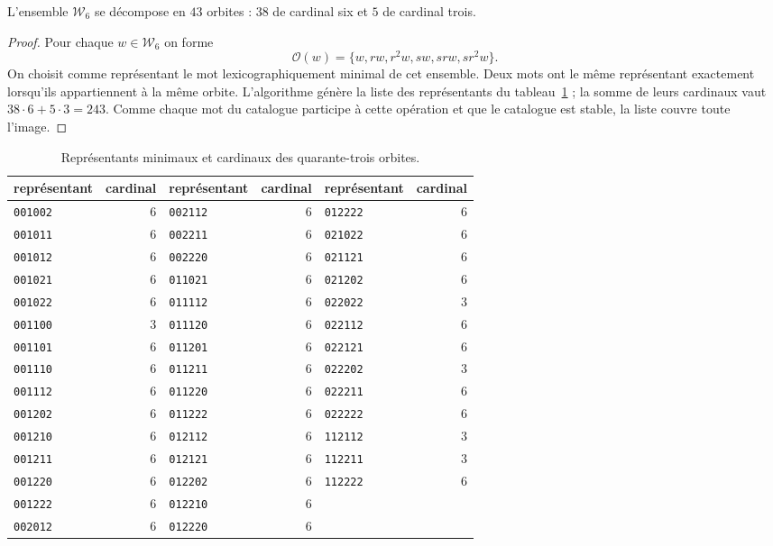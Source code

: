 \begin{proposition}
\label{act21:tpk:43}
L'ensemble \(\mathcal W_6\) se décompose en \(43\) orbites : \(38\)
de cardinal six et \(5\) de cardinal trois.
\end{proposition}
\begin{proof}
Pour chaque \(w\in\mathcal W_6\) on forme
\[
 \mathcal O(w)=\{w,rw,r^2w,sw,srw,sr^2w\}.
\]
On choisit comme représentant le mot lexicographiquement minimal de cet ensemble. Deux mots ont le même représentant exactement lorsqu'ils appartiennent à la même orbite. L'algorithme génère la liste des représentants du tableau~\ref{act21:tpk:representantes} ; la somme de leurs cardinaux vaut \(38\cdot6+5\cdot3=243\). Comme chaque mot du catalogue participe à cette opération et que le catalogue est stable, la liste couvre toute l'image.
\end{proof}

\begin{table}[!htbp]
\caption{Représentants minimaux et cardinaux des quarante-trois orbites.}
\label{act21:tpk:representantes}
\small
\begin{tabular}{@{}lr@{\qquad}lr@{\qquad}lr@{}}
\toprule
représentant&cardinal&représentant&cardinal&représentant&cardinal\\
\midrule
\texttt{001002}&6&\texttt{002112}&6&\texttt{012222}&6\\
\texttt{001011}&6&\texttt{002211}&6&\texttt{021022}&6\\
\texttt{001012}&6&\texttt{002220}&6&\texttt{021121}&6\\
\texttt{001021}&6&\texttt{011021}&6&\texttt{021202}&6\\
\texttt{001022}&6&\texttt{011112}&6&\texttt{022022}&3\\
\texttt{001100}&3&\texttt{011120}&6&\texttt{022112}&6\\
\texttt{001101}&6&\texttt{011201}&6&\texttt{022121}&6\\
\texttt{001110}&6&\texttt{011211}&6&\texttt{022202}&3\\
\texttt{001112}&6&\texttt{011220}&6&\texttt{022211}&6\\
\texttt{001202}&6&\texttt{011222}&6&\texttt{022222}&6\\
\texttt{001210}&6&\texttt{012112}&6&\texttt{112112}&3\\
\texttt{001211}&6&\texttt{012121}&6&\texttt{112211}&3\\
\texttt{001220}&6&\texttt{012202}&6&\texttt{112222}&6\\
\texttt{001222}&6&\texttt{012210}&6&&\\
\texttt{002012}&6&\texttt{012220}&6&&\\
\bottomrule
\end{tabular}
\end{table}


